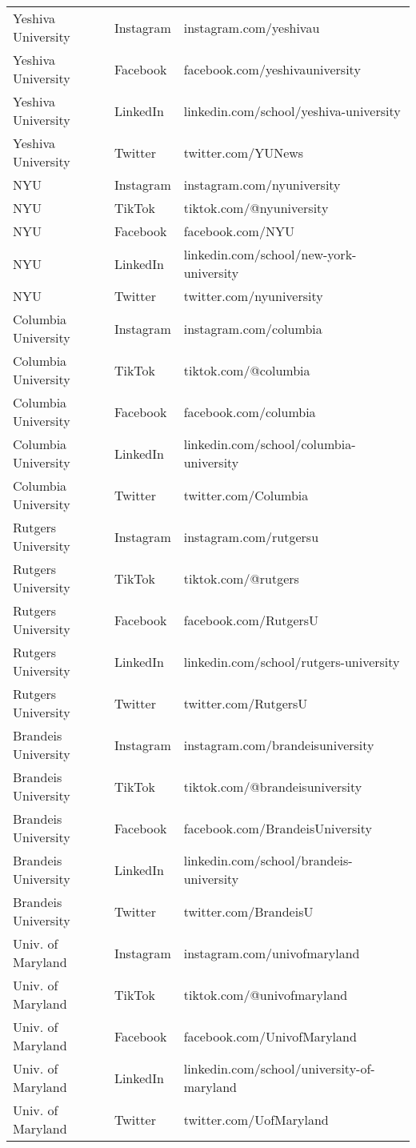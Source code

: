 \documentclass[12pt]{report}
\begin{document}
\begin{longtable}{@{}p{3cm}p{2.5cm}p{7cm}@{}}
Yeshiva University & Instagram & instagram.com/yeshivau \\
Yeshiva University & Facebook & facebook.com/yeshivauniversity \\
Yeshiva University & LinkedIn & linkedin.com/school/yeshiva-university \\
Yeshiva University & Twitter & twitter.com/YUNews \\
\midrule
NYU & Instagram & instagram.com/nyuniversity \\
NYU & TikTok & tiktok.com/@nyuniversity \\
NYU & Facebook & facebook.com/NYU \\
NYU & LinkedIn & linkedin.com/school/new-york-university \\
NYU & Twitter & twitter.com/nyuniversity \\
\midrule
Columbia University & Instagram & instagram.com/columbia \\
Columbia University & TikTok & tiktok.com/@columbia \\
Columbia University & Facebook & facebook.com/columbia \\
Columbia University & LinkedIn & linkedin.com/school/columbia-university \\
Columbia University & Twitter & twitter.com/Columbia \\
\midrule
Rutgers University & Instagram & instagram.com/rutgersu \\
Rutgers University & TikTok & tiktok.com/@rutgers \\
Rutgers University & Facebook & facebook.com/RutgersU \\
Rutgers University & LinkedIn & linkedin.com/school/rutgers-university \\
Rutgers University & Twitter & twitter.com/RutgersU \\
\midrule
Brandeis University & Instagram & instagram.com/brandeisuniversity \\
Brandeis University & TikTok & tiktok.com/@brandeisuniversity \\
Brandeis University & Facebook & facebook.com/BrandeisUniversity \\
Brandeis University & LinkedIn & linkedin.com/school/brandeis-university \\
Brandeis University & Twitter & twitter.com/BrandeisU \\
\midrule
Univ. of Maryland & Instagram & instagram.com/univofmaryland \\
Univ. of Maryland & TikTok & tiktok.com/@univofmaryland \\
Univ. of Maryland & Facebook & facebook.com/UnivofMaryland \\
Univ. of Maryland & LinkedIn & linkedin.com/school/university-of-maryland \\
Univ. of Maryland & Twitter & twitter.com/UofMaryland \\
\end{longtable}
\end{document}
